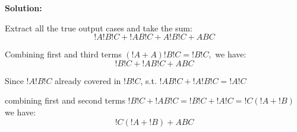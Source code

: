 \textbf{Solution:}

\noindent
Extract all the true output cases and take the sum:
\[
!A !B !C +
!A  B !C +
 A !B !C +
 A  B  C
\]

\noindent
Combining first and third terms
\(
(!A + A) !B !C = !B !C,
\)
we have:
\[
!B !C +
!A  B !C +
 A  B  C
\]

\noindent
Since $!A !B !C$ already covered in $!B !C$, s.t. $!A  B !C + !A !B !C = !A !C$

\noindent
combining first and second terms
\(
!B !C +
!A  B !C
= !B !C + !A !C
= !C(!A + !B)
\)
we have:
\[
\boxed{
!C(!A + !B) +
 A  B  C
}
\]

